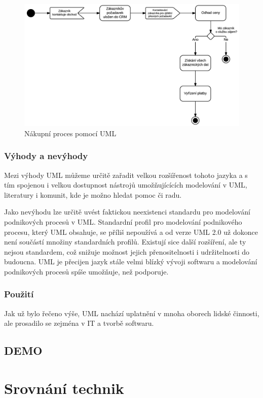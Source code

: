 \documentclass[]{article}
\begin{document}
\begin{figure}[H]\centering
\includegraphics[width=1.0\textwidth]{obrazky/uml_nakupniproces}
\caption{Nákupní proces pomocí UML}
\label{fig:UML_nakupniproces}
\end{figure}

\subsubsection{Výhody a nevýhody}
Mezi výhody UML můžeme určitě zařadit velkou rozšířenost tohoto jazyka a s tím spojenou i velkou dostupnost nástrojů umožňujícících modelování v UML, literatury i komunit, kde je možno hledat pomoc či radu.

Jako nevýhodu lze určitě uvést faktickou neexistenci standardu pro modelování podnikových procesů v UML. Standardní profil pro modelování podnikového procesu, který UML obsahuje, se příliš nepoužívá a od verze UML 2.0 už dokonce není součástí množiny standardních profilů. \cite{Repa2007} Existují sice další rozšíření, ale ty nejsou standardem, což snižuje možnost jejich přenositelnosti i udržitelnosti do budoucna. UML je přecijen jazyk stále velmi blízký vývoji softwaru a modelování podnikových procesů spíše umožňuje, než podporuje.

\subsubsection{Použití}
Jak už bylo řečeno výše, UML nachází uplatnění v mnoha oborech lidské činnosti, ale prosadilo se zejména v IT a tvorbě softwaru. 

\subsection{DEMO}
\section{Srovnání technik}

\nocite{*}


\end{document}
